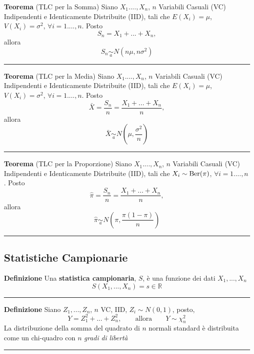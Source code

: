 \documentclass[
  11pt,
]{book}
\theoremstyle{mytheoremstyle}
\theoremstyle{mydefstyle}
\begin{document}
\textbf{Teorema} (TLC per la Somma)
Siano \(X_1....,X_n\), \(n\) Variabili Casuali (VC) Indipendenti e
Identicamente Distribuite (IID), tali che \(E(X_i)=\mu\),
\(V(X_i)=\sigma^2\), \(\forall i=1....,n\). Posto \[S_n=X_1+...+X_n,\]
allora \[S_n\operatorname*{\sim}_{a} N\left(n\mu,n\sigma^2\right)\]

\begin{center}\rule{0.5\linewidth}{0.5pt}\end{center}

\textbf{Teorema} (TLC per la Media)
Siano \(X_1....,X_n\), \(n\) Variabili Casuali (VC) Indipendenti e
Identicamente Distribuite (IID), tali che \(E(X_i)=\mu\),
\(V(X_i)=\sigma^2\), \(\forall i=1....,n\). Posto
\[\bar X =\frac {S_n} n = \frac{X_1+...+X_n}n,\] allora
\[\bar X\operatorname*{\sim}_{a} N\left(\mu,\frac{\sigma^2}n\right)\]

\begin{center}\rule{0.5\linewidth}{0.5pt}\end{center}

\textbf{Teorema} (TLC per la Proporzione)
Siano \(X_1....,X_n\), \(n\) Variabili Casuali (VC) Indipendenti e
Identicamente Distribuite (IID), tali che \(X_i\sim\text{\rm Ber}(\pi)\),
\(\forall i=1....,n\). Posto
\[\hat\pi =\frac {S_n} n = \frac{X_1+...+X_n}n,\] allora
\[\hat\pi\operatorname*{\sim}_{a} N\left(\pi,\frac{\pi(1-\pi)}n\right)\]

\begin{center}\rule{0.5\linewidth}{0.5pt}\end{center}

\subsection{Statistiche Campionarie}\label{statistiche-campionarie-1}

\textbf{Definizione}
Una \textbf{statistica campionaria}, \(S\), è una funzione dei dati \(X_1,...,X_n\)
\[S(X_1,...,X_n)=s\in\mathbb{R}\]

\begin{center}\rule{0.5\linewidth}{0.5pt}\end{center}

\textbf{Definizione}
Siano \(Z_1,...,Z_n\), \(n\) VC, IID, \(Z_i\sim N(0,1)\), posto,
\[Y=Z_1^2+...+Z_n^2, \qquad \text{allora} \qquad Y\sim \chi^2_n\]
La distribuzione della somma del quadrato di \(n\) normali standard è distribuita come un chi-quadro con \(n\) \emph{gradi di libertà}

\begin{center}\rule{0.5\linewidth}{0.5pt}\end{center}
\end{document}
